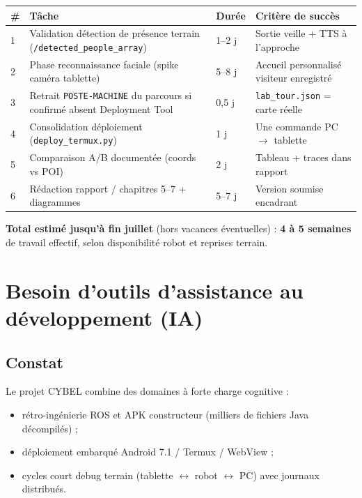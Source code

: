 \documentclass[11pt,a4paper]{article}
\begin{document}
\begin{longtable}{@{}p{}p{}p{}p{}@{}}
\toprule
\textbf{\#} & \textbf{Tâche} & \textbf{Durée} & \textbf{Critère de succès} \\
\midrule
\endhead

1 & Validation détection de présence terrain (\texttt{/detected\_people\_array}) & 1--2 j & Sortie veille + TTS à l'approche \\
2 & Phase reconnaissance faciale (spike caméra tablette) & 5--8 j & Accueil personnalisé visiteur enregistré \\
3 & Retrait \texttt{POSTE-MACHINE} du parcours si confirmé absent Deployment Tool & 0{,}5 j & \texttt{lab\_tour.json} = carte réelle \\
4 & Consolidation déploiement (\texttt{deploy\_termux.py}) & 1 j & Une commande PC $\rightarrow$ tablette \\
5 & Comparaison A/B documentée (coords vs POI) & 2 j & Tableau + traces dans rapport \\
6 & Rédaction rapport / chapitres 5--7 + diagrammes & 5--7 j & Version soumise encadrant \\

\bottomrule
\end{longtable}

\textbf{Total estimé jusqu'à fin juillet} (hors vacances éventuelles) : \textbf{4 à 5 semaines} de travail effectif, selon disponibilité robot et reprises terrain.

\section{Besoin d'outils d'assistance au développement (IA)}

\subsection{Constat}

Le projet CYBEL combine des domaines à forte charge cognitive :
\begin{itemize}[noitemsep]
  \item rétro-ingénierie ROS et APK constructeur (milliers de fichiers Java décompilés) ;
  \item déploiement embarqué Android 7.1 / Termux / WebView ;
  \item cycles court debug terrain (tablette $\leftrightarrow$ robot $\leftrightarrow$ PC) avec journaux distribués.
\end{itemize}
\end{document}
